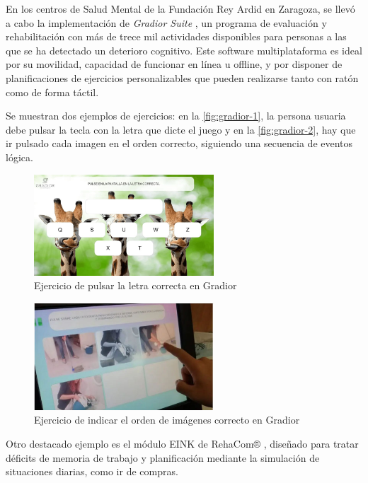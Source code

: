 En los centros de Salud Mental de la Fundación Rey Ardid en Zaragoza, se llevó a cabo la implementación de \textit{Gradior Suite} \parencite{reyardid}, un programa de evaluación y rehabilitación con más de trece mil actividades disponibles para personas a las que se ha detectado un deterioro cognitivo. Este software multiplataforma es ideal por su movilidad, capacidad de funcionar en línea u offline, y por disponer de planificaciones de ejercicios personalizables que pueden realizarse tanto con ratón como de forma táctil. 

Se muestran dos ejemplos de ejercicios: en la \autoref{fig:gradior-1}, la persona usuaria debe pulsar la tecla con la letra que dicte el juego y en la \autoref{fig:gradior-2}, hay que ir pulsado cada imagen en el orden correcto, siguiendo una secuencia de eventos lógica.

\begin{figure}[H]
    \centering
    \includegraphics[width=0.6\textwidth]{imgs/gradior.jpg}
    \caption{Ejercicio de pulsar la letra correcta en Gradior}
    \label{fig:gradior-1}
\end{figure}

\begin{figure}[H]
	\centering
	\includegraphics[width=0.6\textwidth]{imgs/gradior-2.jpg}
	\caption{Ejercicio de indicar el orden de imágenes correcto en Gradior}
	\label{fig:gradior-2}
\end{figure}

Otro destacado ejemplo es el módulo EINK de RehaCom® \parencite{hasomed2024}, diseñado para tratar déficits de memoria de trabajo y planificación mediante la simulación de situaciones diarias, como ir de compras. 

